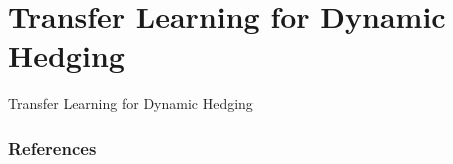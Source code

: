 \documentclass[9pt,handout]{beamer}
\begin{document}
\section{Transfer Learning for Dynamic Hedging}
\begin{frame}{Transfer Learning for Dynamic Hedging}

\end{frame}

\begin{frame}
    \frametitle{References}
    
    
\end{frame}
\end{document}
